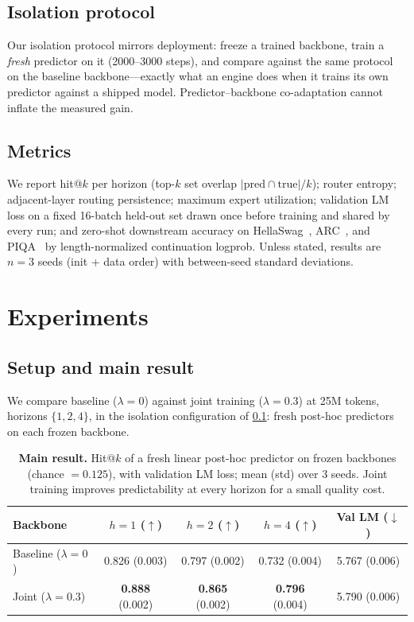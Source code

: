 \documentclass[10pt,letterpaper]{article}
\begin{document}
\subsection{Isolation protocol}
\label{sec:protocol}

Our isolation protocol mirrors deployment: freeze a trained backbone, train a \emph{fresh} predictor on it (2000--3000 steps), and compare against the same protocol on the baseline backbone---exactly what an engine does when it trains its own predictor against a shipped model. Predictor--backbone co-adaptation cannot inflate the measured gain.

\subsection{Metrics}
\label{sec:metrics}

We report hit@$k$ per horizon (top-$k$ set overlap $|\mathrm{pred} \cap \mathrm{true}|/k$); router entropy; adjacent-layer routing persistence; maximum expert utilization; validation LM loss on a fixed 16-batch held-out set drawn once before training and shared by every run; and zero-shot downstream accuracy on HellaSwag~\citep{zellers2019hellaswag}, ARC~\citep{clark2018arc}, and PIQA~\citep{bisk2020piqa} by length-normalized continuation logprob. Unless stated, results are $n{=}3$ seeds (init + data order) with between-seed standard deviations.

\section{Experiments}
\label{sec:experiments}

\subsection{Setup and main result}
\label{sec:main}

We compare baseline ($\lambda{=}0$) against joint training ($\lambda{=}0.3$) at 25M tokens, horizons $\{1,2,4\}$, in the isolation configuration of \cref{sec:protocol}: fresh post-hoc predictors on each frozen backbone.

\begin{table}[t]
  \centering
  \caption{\textbf{Main result.} Hit@$k$ of a fresh linear post-hoc predictor on frozen backbones (chance $=0.125$), with validation LM loss; mean (std) over 3 seeds. Joint training improves predictability at every horizon for a small quality cost.}
  \label{tab:main}
  \begin{tabular}{lcccc}
    \toprule
    Backbone & $h{=}1$ ($\uparrow$) & $h{=}2$ ($\uparrow$) & $h{=}4$ ($\uparrow$) & Val LM ($\downarrow$) \\
    \midrule
    Baseline ($\lambda{=}0$) & 0.826 (0.003) & 0.797 (0.002) & 0.732 (0.004) & 5.767 (0.006) \\
    \midrule
    Joint ($\lambda{=}0.3$) & \textbf{0.888} (0.002) & \textbf{0.865} (0.002) & \textbf{0.796} (0.004) & 5.790 (0.006) \\
    \bottomrule
  \end{tabular}
\end{table}
\end{document}
